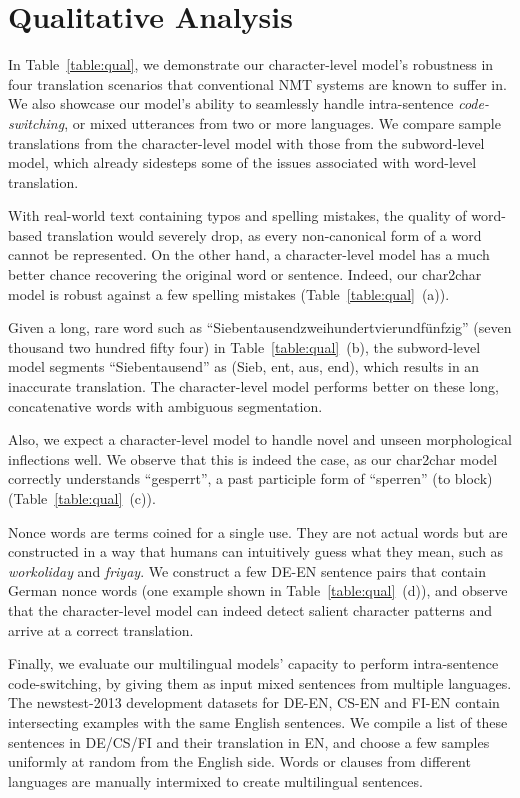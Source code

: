 \documentclass[11pt,letterpaper]{article}
\newcommand{\ti}{\textit}
\newcommand{\nrr}{\color{black}}
\begin{document}
\section{Qualitative Analysis}\label{sec:qual}

In Table~\ref{table:qual}, we demonstrate our character-level model's robustness in four translation scenarios that conventional NMT systems are known to suffer in. We also showcase our model's ability to seamlessly handle intra-sentence \ti{code-switching}, or mixed utterances from two or more languages. We compare sample translations from the character-level model with those from the subword-level model, which already sidesteps some of the issues associated with word-level translation.

With real-world text containing typos and spelling mistakes, the quality of word-based translation would severely drop, as every non-canonical form of a word cannot be represented. On the other hand, a character-level model has a much better chance recovering the original word or sentence. Indeed, our char2char model is robust against a few spelling mistakes (Table~\ref{table:qual}~(a)).

Given a long, rare word such as ``Siebentausendzweihundertvierundf\"unfzig'' (seven thousand two hundred fifty four) in Table~\ref{table:qual}~(b), {\nrr the subword-level model segments ``Siebentausend'' as (Sieb, ent, aus, end), which results in an inaccurate translation.} The character-level model performs better on these long, concatenative words with ambiguous segmentation.

Also, we expect a character-level model to handle novel and unseen morphological inflections well. We observe that this is indeed the case, as our char2char model correctly understands ``gesperrt'', a past participle form of ``sperren'' (to block) (Table~\ref{table:qual}~(c)).

Nonce words are terms coined for a single use. They are not actual words but are constructed in a way that humans can intuitively guess what they mean, such as \ti{workoliday} and \ti{friyay}. We construct a few DE-EN sentence pairs that contain German nonce words (one example shown in Table~\ref{table:qual}~(d)), and observe that the character-level model can indeed detect salient character patterns and arrive at a correct translation.

Finally, we evaluate our multilingual models' capacity to perform intra-sentence code-switching, by giving them as input mixed sentences from multiple languages. {\nrr The newstest-2013 development datasets for DE-EN, CS-EN and FI-EN contain intersecting examples with the same English sentences. We compile a list of these sentences in DE/CS/FI and their translation in EN, and choose a few samples uniformly at random from the English side. Words or clauses from different languages are manually intermixed to create multilingual sentences. }
\end{document}
